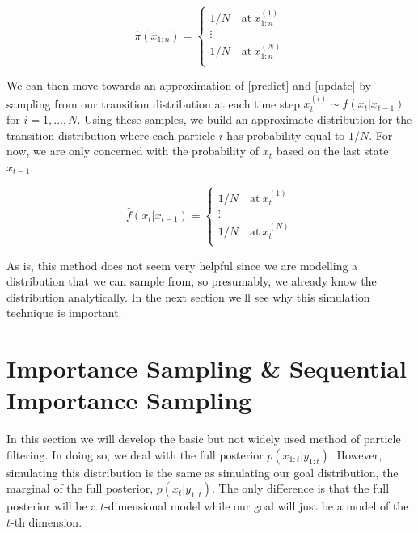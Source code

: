 \documentclass{article}
\begin{document}
\begin{equation}
\widehat{\pi}(x_{1:n}) = \begin{cases}
1/N \quad \text{at} \ x_{1:n}^{(1)} \\
\vdots \\
1/N \quad \text{at} \ x_{1:n}^{(N)} \\
\end{cases}
\end{equation}

We can then move towards an approximation of \eqref{predict} and \eqref{update} by sampling from our transition distribution at each time step $x_{t}^{(i)} \sim f(x_t|x_{t-1})$ for $i = 1,\dots,N$. Using these samples, we build an approximate distribution for the transition distribution where each particle $i$ has probability equal to $1/N$. For now, we are only concerned with the probability of $x_t$ based on the last state $x_{t-1}$.

\begin{equation}
\widehat{f}(x_t|x_{t-1}) = \begin{cases}
1/N \quad \text{at} \ x_{t}^{(1)} \\
\vdots \\
1/N \quad \text{at} \ x_{t}^{(N)} \\
\end{cases}
\end{equation}

As is, this method does not seem very helpful since we are modelling a distribution that we can sample from, so presumably, we already know the distribution analytically. In the next section we'll see why this simulation technique is important.


\section{Importance Sampling \& Sequential Importance Sampling}
In this section we will develop the basic but not widely used method of particle filtering. In doing so, we deal with the full posterior $p(x_{1:t}|y_{1:t})$. However, simulating this distribution is the same as simulating our goal distribution, the marginal of the full posterior, $p(x_t|y_{1:t})$. The only difference is that the full posterior will be a $t$-dimensional model while our goal will just be a model of the $t$-th dimension.
\end{document}
